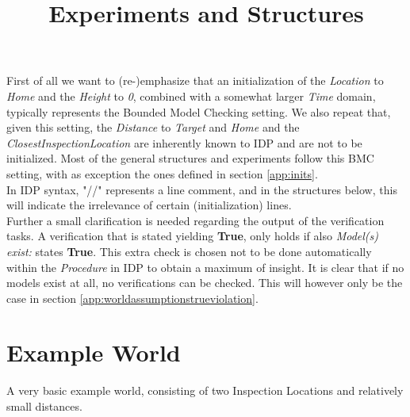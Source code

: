 \documentclass[12pt]{extarticle}
\begin{document}
\title{Experiments and Structures}
\date{}
\author{}
\maketitle
\noindent
First of all we want to (re-)emphasize that an initialization of the \textit{Location} to \textit{Home} and the \textit{Height} to \textit{0}, combined with a somewhat larger \textit{Time} domain, typically represents the Bounded Model Checking setting. We also repeat that, given this setting, the \textit{Distance} to \textit{Target} and \textit{Home} and the \textit{ClosestInspectionLocation} are inherently known to IDP and are not to be initialized. Most of the general structures and experiments follow this BMC setting, with as exception the ones defined in section \ref{app:inits}.\\
In IDP syntax, "//" represents a line comment, and in the structures below, this will indicate the irrelevance of certain (initialization) lines.\\
Further a small clarification is needed regarding the output of the verification tasks. A verification that is stated yielding \textbf{True}, only holds if also \textit{Model(s) exist:} states \textbf{True}. This extra check is chosen not to be done automatically within the \textit{Procedure} in IDP to obtain a maximum of insight. It is clear that if no models exist at all, no verifications can be checked. This will however only be the case in section \ref{app:worldassumptionstrueviolation}.
\section{Example World}
\label{app:exampleworld}
A very basic example world, consisting of two Inspection Locations and relatively small distances.
\end{document}
